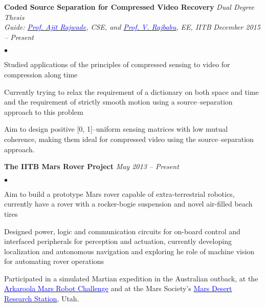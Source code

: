 \documentclass[margin,line]{res}
\newenvironment{list2}{
  \begin{list}{$\bullet$}{%
      \setlength{\itemsep}{0in}
      \setlength{\parsep}{0in} \setlength{\parskip}{0in}
      \setlength{\topsep}{0in} \setlength{\partopsep}{0in} 
      \setlength{\leftmargin}{0.2in}}}{\end{list}}
\begin{document}
\begin{resume}
\vspace*{-0.13in}

{\bf Coded Source Separation for Compressed Video Recovery} \hfill \textit{Dual Degree Thesis} \\
{\em Guide: \href{https://www.cse.iitb.ac.in/~ajitvr}{\textcolor{blue}{Prof. Ajit Rajwade}}, CSE, and \href{https://www.ee.iitb.ac.in/wiki/faculty/rajbabu}{\textcolor{blue}{Prof. V. Rajbabu}}, EE, IITB} \hfill {\it December 2015 -- Present} \\
\vspace*{-.13in}
\begin{list2}
\item Studied applications of the principles of compressed sensing to video for compression along time
\item Currently trying to relax the requirement of a dictionary on both space and time and the requirement of strictly smooth motion using a source--separation approach to this problem
\item Aim to design positive [0, 1]--uniform sensing matrices with low mutual coherence, making them ideal for compressed video using the source--separation approach.
\end{list2}

\vspace*{-0.13in}

{\bf The IITB Mars Rover Project}
\hfill {\it May 2013 -- Present} \\
\vspace*{-.13in}
\begin{list2}
\item Aim to build a prototype Mars rover capable of extra-terrestrial robotics, currently have a rover with a rocker-bogie suspension and novel air-filled beach tires
\item Designed power, logic and communication circuits for on-board control and interfaced peripherals for perception and actuation, currently developing localization and autonomous navigation and exploring he role of machine vision for automating rover operations
\item Participated in a simulated Martian expedition in the Australian outback, at the \href{http://marssociety.org.au/article/arkaroola-mars-robot-challenge-spaceward-bound-expedition}{\textcolor{blue} {Arkaroola Mars Robot Challenge}} and at the Mars Society's \href{http://mdrs.marssociety.org/}{\textcolor{blue} {Mars Desert Research Station}}, Utah.
\end{list2}


\end{resume}
\end{document}
